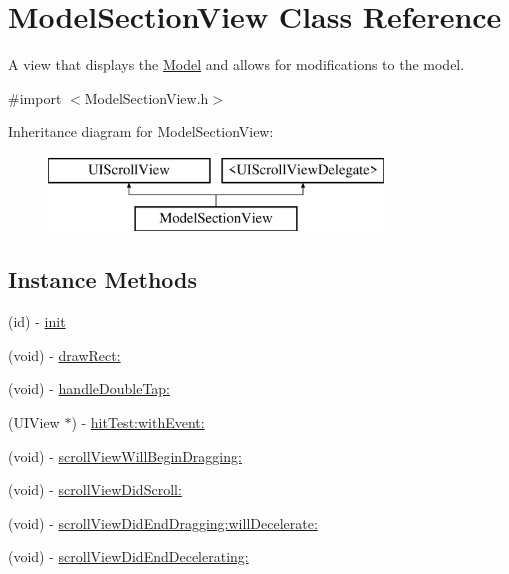 \hypertarget{interface_model_section_view}{\section{Model\-Section\-View Class Reference}
\label{interface_model_section_view}
}


A view that displays the \hyperlink{interface_model}{Model} and allows for modifications to the model.  




{\ttfamily \#import $<$Model\-Section\-View.\-h$>$}

Inheritance diagram for Model\-Section\-View\-:\begin{figure}[H]
\begin{center}
\leavevmode
\includegraphics[height=2.000000cm]{interface_model_section_view}
\end{center}
\end{figure}
\subsection*{Instance Methods}
\begin{DoxyCompactItemize}
\item 
(id) -\/ \hyperlink{interface_model_section_view_a4213bb26f5207ee3f402fe463badc691}{init}
\item 
(void) -\/ \hyperlink{interface_model_section_view_a8c03538769a6fcbd7aa8e672cf4b5c96}{draw\-Rect\-:}
\item 
(void) -\/ \hyperlink{interface_model_section_view_abe37687ff567bae7bca561f22b7a1802}{handle\-Double\-Tap\-:}
\item 
(U\-I\-View $\ast$) -\/ \hyperlink{interface_model_section_view_ac1af4c1c7381cee5560d9ddebdf8203a}{hit\-Test\-:with\-Event\-:}
\item 
(void) -\/ \hyperlink{interface_model_section_view_aad6be714d494a1b1bfd3e148ac1ff13b}{scroll\-View\-Will\-Begin\-Dragging\-:}
\item 
(void) -\/ \hyperlink{interface_model_section_view_a863eaf47ffa7b051ba103a60fc8bfdf8}{scroll\-View\-Did\-Scroll\-:}
\item 
(void) -\/ \hyperlink{interface_model_section_view_ab8c0489df0e1103bd844273e1f31cd9e}{scroll\-View\-Did\-End\-Dragging\-:will\-Decelerate\-:}
\item 
(void) -\/ \hyperlink{interface_model_section_view_a33f55893a32225b60aba8e51445250c6}{scroll\-View\-Did\-End\-Decelerating\-:}
\end{DoxyCompactItemize}


